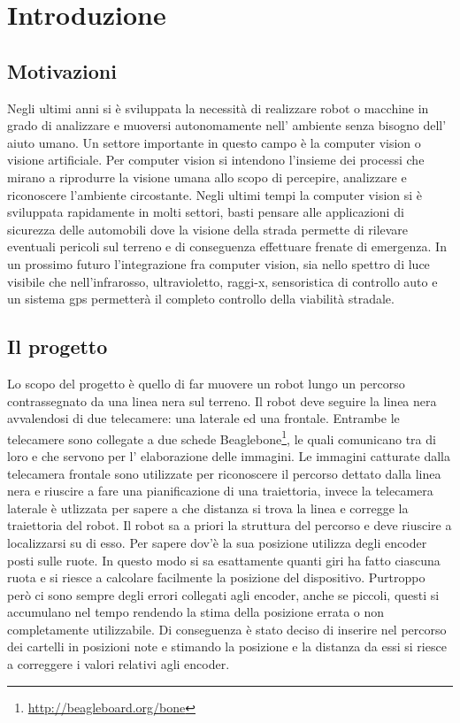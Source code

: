 \chapter{Introduzione}

\section{Motivazioni}

	Negli ultimi anni si è sviluppata la necessità di realizzare robot o macchine in grado di analizzare e muoversi autonomamente nell' ambiente senza bisogno dell' aiuto umano. Un settore importante in questo campo è la computer vision o visione artificiale. Per computer vision si intendono l’insieme dei processi che mirano a riprodurre la visione umana allo scopo di percepire, analizzare e riconoscere l'ambiente circostante. Negli ultimi tempi la computer vision si è sviluppata rapidamente in molti settori, basti pensare alle applicazioni di sicurezza delle automobili dove la visione della strada permette di rilevare eventuali pericoli sul terreno e di conseguenza effettuare frenate di emergenza. In un prossimo futuro l'integrazione fra computer vision, sia nello spettro di luce visibile che nell'infrarosso, ultravioletto, raggi-x, sensoristica di controllo auto e un sistema gps permetterà il completo controllo della viabilità stradale.

\section{Il progetto}

	Lo scopo del progetto è quello di far muovere un robot lungo un percorso contrassegnato da una linea nera sul terreno. Il robot deve seguire la linea nera avvalendosi di due telecamere: una laterale ed una frontale. Entrambe le telecamere sono collegate a due schede Beaglebone\footnote{\url{http://beagleboard.org/bone}}, le quali comunicano tra di loro e che servono per l' elaborazione delle immagini. Le immagini catturate dalla telecamera frontale sono utilizzate per riconoscere il percorso dettato dalla linea nera e riuscire a fare una pianificazione di una traiettoria, invece la telecamera laterale è utlizzata per sapere a che distanza si trova la linea e corregge la traiettoria del robot. Il robot sa a priori la struttura del percorso e deve riuscire a localizzarsi su di esso. Per sapere dov'è la sua posizione utilizza degli encoder posti sulle ruote. In questo modo si sa esattamente quanti giri ha fatto ciascuna ruota e si riesce a calcolare facilmente la posizione del dispositivo. Purtroppo però ci sono sempre degli errori collegati agli encoder, anche se piccoli, questi si accumulano nel tempo rendendo la stima della posizione errata o non completamente utilizzabile. Di conseguenza è stato deciso di inserire nel percorso dei cartelli in posizioni note e stimando la posizione e la distanza da essi si riesce a correggere i valori relativi agli encoder.

